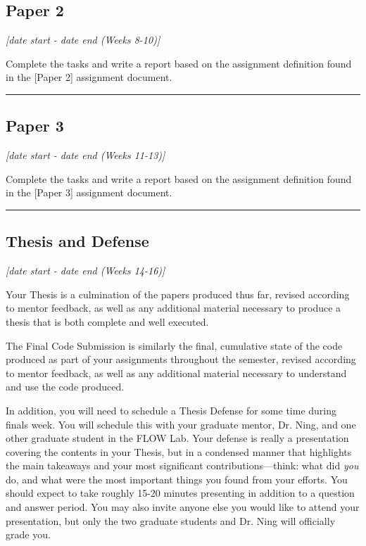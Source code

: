 \documentclass[12pt]{article}
\begin{document}
\subsection{Paper 2}
\label{ssec:p2}

\textit{[date start - date end (Weeks 8-10)]}

\bigskip

Complete the tasks and write a report based on the assignment definition found in the [Paper 2] assignment document.



\vspace{1em}\hrule\vspace{1em}
\subsection{Paper 3}
\label{ssec:p3}

\textit{[date start - date end (Weeks 11-13)]}

\bigskip

Complete the tasks and write a report based on the assignment definition found in the [Paper 3] assignment document.

\bigskip


\vspace{1em}\hrule\vspace{1em}
\subsection{Thesis and Defense}
\label{sec:finalreport}

\textit{[date start - date end (Weeks 14-16)]}

\bigskip

Your Thesis is a culmination of the papers produced thus far, revised according to mentor feedback, as well as any additional material necessary to produce a thesis that is both complete and well executed.

The Final Code Submission is similarly the final, cumulative state of the code produced as part of your assignments throughout the semester, revised according to mentor feedback, as well as any additional material necessary to understand and use the code produced.

In addition, you will need to schedule a Thesis Defense for some time during finals week.
You will schedule this with your graduate mentor, Dr. Ning, and one other graduate student in the FLOW Lab.
Your defense is really a presentation covering the contents in your Thesis, but in a condensed manner that highlights the main takeaways and your most significant contributions---think: what did \textit{you} do, and what were the most important things you found from your efforts.
You should expect to take roughly 15-20 minutes presenting in addition to a question and answer period.
You may also invite anyone else you would like to attend your presentation, but only the two graduate students and Dr. Ning will officially grade you.
\end{document}
